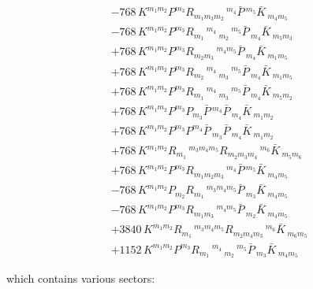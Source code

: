 \begin{align}
&-768\,K^{{m_{1}} {m_{2}}} P^{{m_{3}}} R_{{m_{1}} {m_{3}} {m_{2}}}\,^{{m_{4}}} \bar{P}\,^{{m_{5}}} \bar{K}\,_{{m_{4}} {m_{5}}}\\
&-768\,K^{{m_{1}} {m_{2}}} P^{{m_{3}}} R_{{m_{1}}}\,^{{m_{4}}}\,_{{m_{2}}}\,^{{m_{5}}} \bar{P}\,_{{m_{4}}} \bar{K}\,_{{m_{5}} {m_{3}}}\\
&+768\,K^{{m_{1}} {m_{2}}} P^{{m_{3}}} R_{{m_{2}} {m_{3}}}\,^{{m_{4}} {m_{5}}} \bar{P}\,_{{m_{4}}} \bar{K}\,_{{m_{1}} {m_{5}}}\\
&+768\,K^{{m_{1}} {m_{2}}} P^{{m_{3}}} R_{{m_{2}}}\,^{{m_{4}}}\,_{{m_{3}}}\,^{{m_{5}}} \bar{P}\,_{{m_{4}}} \bar{K}\,_{{m_{1}} {m_{5}}}\\
&+768\,K^{{m_{1}} {m_{2}}} P^{{m_{3}}} R_{{m_{1}}}\,^{{m_{4}}}\,_{{m_{3}}}\,^{{m_{5}}} \bar{P}\,_{{m_{4}}} \bar{K}\,_{{m_{5}} {m_{2}}}\\
&+768\,K^{{m_{1}} {m_{2}}} P^{{m_{3}}} P_{{m_{3}}} \bar{P}\,^{{m_{4}}} \bar{P}\,_{{m_{4}}} \bar{K}\,_{{m_{1}} {m_{2}}}\\
&+768\,K^{{m_{1}} {m_{2}}} P^{{m_{3}}} P^{{m_{4}}} \bar{P}\,_{{m_{3}}} \bar{P}\,_{{m_{4}}} \bar{K}\,_{{m_{1}} {m_{2}}}\\
&+768\,K^{{m_{1}} {m_{2}}} R_{{m_{1}}}\,^{{m_{3}} {m_{4}} {m_{5}}} R_{{m_{2}} {m_{3}} {m_{4}}}\,^{{m_{6}}} \bar{K}\,_{{m_{5}} {m_{6}}}\\
&+768\,K^{{m_{1}} {m_{2}}} P^{{m_{3}}} R_{{m_{1}} {m_{2}} {m_{3}}}\,^{{m_{4}}} \bar{P}\,^{{m_{5}}} \bar{K}\,_{{m_{4}} {m_{5}}}\\
&-768\,K^{{m_{1}} {m_{2}}} P_{{m_{2}}} R_{{m_{1}}}\,^{{m_{3}} {m_{4}} {m_{5}}} \bar{P}\,_{{m_{3}}} \bar{K}\,_{{m_{4}} {m_{5}}}\\
&-768\,K^{{m_{1}} {m_{2}}} P^{{m_{3}}} R_{{m_{1}} {m_{3}}}\,^{{m_{4}} {m_{5}}} \bar{P}\,_{{m_{2}}} \bar{K}\,_{{m_{4}} {m_{5}}}\\
&+3840\,K^{{m_{1}} {m_{2}}} R_{{m_{1}}}\,^{{m_{3}} {m_{4}} {m_{5}}} R_{{m_{2}} {m_{4}} {m_{3}}}\,^{{m_{6}}} \bar{K}\,_{{m_{6}} {m_{5}}}\\
&+1152\,K^{{m_{1}} {m_{2}}} P^{{m_{3}}} R_{{m_{1}}}\,^{{m_{4}}}\,_{{m_{2}}}\,^{{m_{5}}} \bar{P}\,_{{m_{3}}} \bar{K}\,_{{m_{4}} {m_{5}}}
\end{align}

which contains various sectors:


